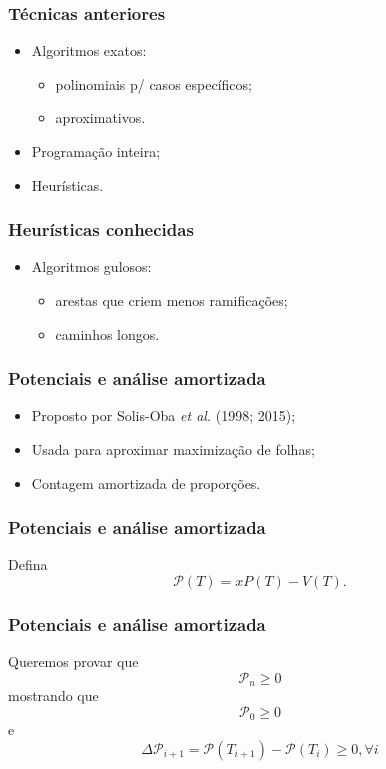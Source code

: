 \documentclass[14pt]{beamer}
\begin{document}
\begin{frame}
\frametitle{T\'ecnicas anteriores}
\begin{itemize}
\item<1->Algoritmos exatos:
\begin{itemize}
\item polinomiais p/ casos espec\'ificos;
\item aproximativos.
\end{itemize}
\item<2->Programa\c{c}\~ao inteira;
\item<3->Heur\'isticas.
\end{itemize}
\end{frame}

\begin{frame}
\frametitle{Heur\'isticas conhecidas}
\begin{itemize}
\item Algoritmos gulosos:
\begin{itemize}
\item arestas que criem menos ramifica\c{c}\~oes;
\item caminhos longos.
\end{itemize}
\end{itemize}
\end{frame}

\begin{frame}
\frametitle{Potenciais e an\'alise amortizada}
\begin{itemize}
\item<1-> Proposto por Solis-Oba \textit{et al.} (1998; 2015);
\item<2-> Usada para aproximar maximiza\c{c}\~ao de folhas;
\item<3-> Contagem amortizada de propor\c{c}\~oes.
\end{itemize}
\end{frame}

\begin{frame}
\frametitle{Potenciais e an\'alise amortizada}
Defina
\begin{equation}
\mathcal{P}(T) = xP(T) - V(T).
\end{equation}
\end{frame}

\begin{frame}
\frametitle{Potenciais e an\'alise amortizada}
Queremos provar que
\begin{equation}
\mathcal{P}_n \ge 0
\end{equation}
mostrando que
\begin{equation}
\mathcal{P}_0 \ge 0
\end{equation}
e
\begin{equation}
\Delta \mathcal{P}_{i + 1} = \mathcal{P}(T_{i + 1}) - \mathcal{P}(T_i) \ge 0, \forall i
\end{equation}
\end{frame}
\end{document}
